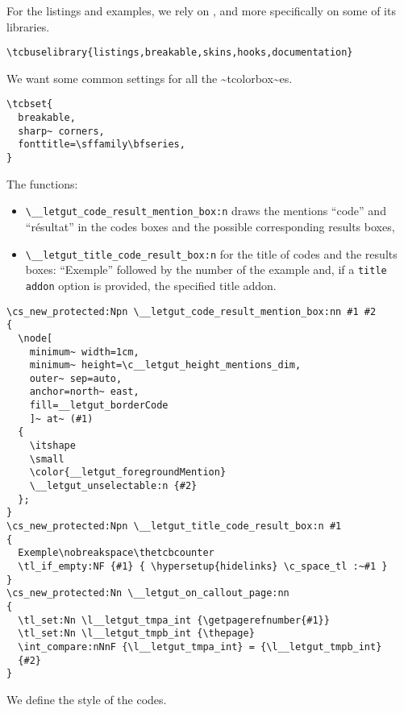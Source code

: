 \documentclass{letgut}
\begin{document}
For the listings and examples, we rely on , and more
specifically on some of its libraries.

\begin{lstlisting}
\tcbuselibrary{listings,breakable,skins,hooks,documentation}
\end{lstlisting}

We want some common settings for all the \textasciitilde{}tcolorbox\textasciitilde{}es.

\begin{lstlisting}
\tcbset{
  breakable,
  sharp~ corners,
  fonttitle=\sffamily\bfseries,
}
\end{lstlisting}

The functions:

\begin{itemize}
\item \lstinline+\__letgut_code_result_mention_box:n+ draws the mentions “code” and “résultat”
in the codes boxes and the possible corresponding results boxes,
\item \lstinline+\__letgut_title_code_result_box:n+ for the title of codes and the results
boxes: “Exemple” followed by the number of the example and, if a \lstinline+title addon+
option is provided, the specified title addon.
\end{itemize}

\begin{lstlisting}
\cs_new_protected:Npn \__letgut_code_result_mention_box:nn #1 #2
{
  \node[
    minimum~ width=1cm,
    minimum~ height=\c__letgut_height_mentions_dim,
    outer~ sep=auto,
    anchor=north~ east,
    fill=__letgut_borderCode
    ]~ at~ (#1)
  {
    \itshape
    \small
    \color{__letgut_foregroundMention}
    \__letgut_unselectable:n {#2}
  };
}
\cs_new_protected:Npn \__letgut_title_code_result_box:n #1
{
  Exemple\nobreakspace\thetcbcounter
  \tl_if_empty:NF {#1} { \hypersetup{hidelinks} \c_space_tl :~#1 }
}
\cs_new_protected:Nn \__letgut_on_callout_page:nn
{
  \tl_set:Nn \l__letgut_tmpa_int {\getpagerefnumber{#1}}
  \tl_set:Nn \l__letgut_tmpb_int {\thepage}
  \int_compare:nNnF {\l__letgut_tmpa_int} = {\l__letgut_tmpb_int}
  {#2}
}
\end{lstlisting}

We define the style of the codes.
\end{document}
